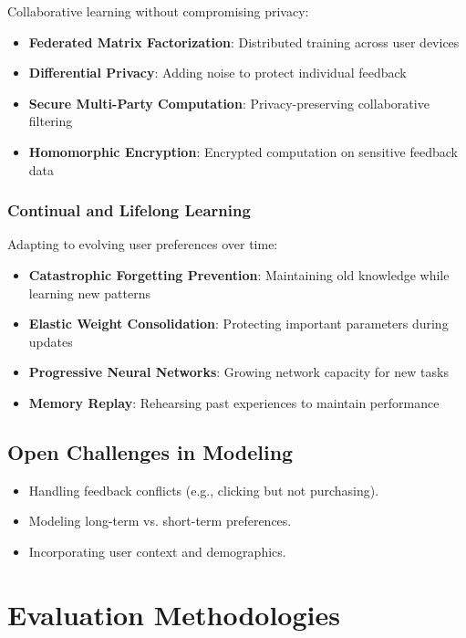 \documentclass[acmsmall,review,anonymous]{acmart}
\begin{document}
Collaborative learning without compromising privacy:

\begin{itemize}
    \item \textbf{Federated Matrix Factorization}: Distributed training across user devices
    \item \textbf{Differential Privacy}: Adding noise to protect individual feedback
    \item \textbf{Secure Multi-Party Computation}: Privacy-preserving collaborative filtering
    \item \textbf{Homomorphic Encryption}: Encrypted computation on sensitive feedback data
\end{itemize}

\subsubsection{Continual and Lifelong Learning}

Adapting to evolving user preferences over time:

\begin{itemize}
    \item \textbf{Catastrophic Forgetting Prevention}: Maintaining old knowledge while learning new patterns
    \item \textbf{Elastic Weight Consolidation}: Protecting important parameters during updates
    \item \textbf{Progressive Neural Networks}: Growing network capacity for new tasks
    \item \textbf{Memory Replay}: Rehearsing past experiences to maintain performance
\end{itemize}

\subsection{Open Challenges in Modeling}

\begin{itemize}
    \item Handling feedback conflicts (e.g., clicking but not purchasing).
    \item Modeling long-term vs. short-term preferences.
    \item Incorporating user context and demographics.
\end{itemize}

\section{Evaluation Methodologies}
\label{sec:evaluation}
\end{document}
